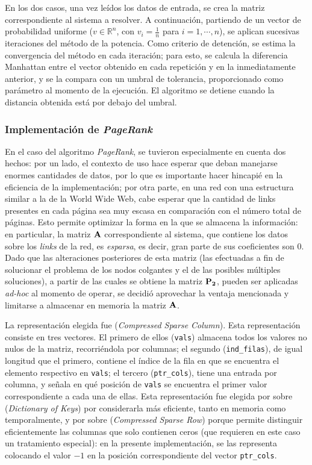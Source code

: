     En los dos casos, una vez leídos los datos de entrada, se crea la matriz correspondiente al sistema a resolver. A continuación, partiendo de un vector de probabilidad uniforme ($v \in \mathbb{R}^n$, con $v_i = \frac{1}{n}$ para $i = 1, \cdots, n$), se aplican sucesivas iteraciones del método de la potencia. Como criterio de detención, se estima la convergencia del método en cada iteración; para esto, se calcula la diferencia Manhattan entre el vector obtenido en cada repetición y en la inmediatamente anterior, y se la compara con un umbral de tolerancia, proporcionado como parámetro al momento de la ejecución. El algoritmo se detiene cuando la distancia obtenida está por debajo del umbral.

        \subsubsection{Implementación de \emph{PageRank}}

        En el caso del algoritmo \emph{PageRank}, se tuvieron especialmente en cuenta dos hechos: por un lado, el contexto de uso hace esperar que deban manejarse enormes cantidades de datos, por lo que es importante hacer hincapié en la eficiencia de la implementación; por otra parte, en una red con una estructura similar a la de la World Wide Web, cabe esperar que la cantidad de links presentes en cada página sea muy escasa en comparación con el número total de páginas. Esto permite optimizar la forma en la que se almacena la información: en particular, la matriz $\mathbf{A}$ correspondiente al sistema, que contiene los datos sobre los \emph{links} de la red, es \emph{esparsa}, es decir, gran parte de sus coeficientes son $0$. Dado que las alteraciones posteriores de esta matriz (las efectuadas a fin de solucionar el problema de los nodos colgantes y el de las posibles múltiples soluciones), a partir de las cuales se obtiene la matriz $\mathbf{P_2}$, pueden ser aplicadas \emph{ad-hoc} al momento de operar, se decidió aprovechar la ventaja mencionada y limitarse a almacenar en memoria la matriz $\mathbf{A}$.

        La representación elegida fue  (\emph{Compressed Sparse Column}). Esta representación consiste en tres vectores. El primero de ellos (\texttt{vals}) almacena todos los valores no nulos de la matriz, recorriéndola por columnas; el segundo (\texttt{ind\_filas}), de igual longitud que el primero, contiene el índice de la fila en que se encuentra el elemento respectivo en \texttt{vals}; el tercero (\texttt{ptr\_cols}), tiene una entrada por columna, y señala en qué posición de \texttt{vals} se encuentra el primer valor correspondiente a cada una de ellas. Esta representación fue elegida por sobre  (\emph{Dictionary of Keys}) por considerarla más eficiente, tanto en memoria como temporalmente, y por sobre  (\emph{Compressed Sparse Row}) porque permite distinguir eficientemente las columnas que solo contienen ceros (que requieren en este caso un tratamiento especial): en la presente implementación, se las representa colocando el valor $-1$ en la posición correspondiente del vector \texttt{ptr\_cols}.

